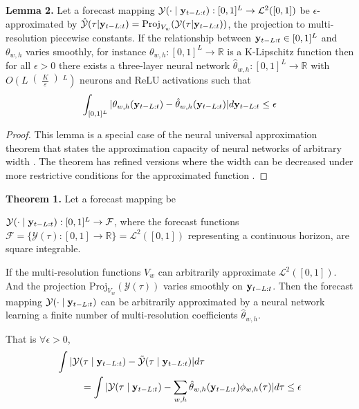 \textbf{Lemma 2.}
Let a forecast mapping $\mathcal{Y}(\cdot\;|\;\mathbf{y}_{t-L:t}): [0,1]^{L} \to \mathcal{L}^{2}([0,1])$ be $\epsilon$-approximated by $\hat{\mathcal{Y}}(\tau |\mathbf{y}_{t-L:t})=\mathrm{Proj}_{V_{w}}(\mathcal{Y}(\tau|\mathbf{y}_{t-L:t}))$, the projection to multi-resolution piecewise constants. If the relationship between $\mathbf{y}_{t-L:t} \in [0,1]^{L}$ and $\theta_{w,h}$ varies smoothly, for instance $\theta_{w,h}:[0,1]^{L}\to \mathbb{R}$ is a K-Lipschitz function then for all $\epsilon > 0$ there exists a three-layer neural network $\hat{\theta}_{w,h}: [0, 1]^L \rightarrow \mathbb{R}$ with $O\left(L\right(\frac{K}{\varepsilon}\left)^L\right)$ neurons and $\mathrm{ReLU}$ activations such that 
\begin{equation}
\int_{[0, 1]^L} |\theta_{w,h}(\mathbf{y}_{t-L:t}) - \hat{\theta}_{w,h}(\mathbf{y}_{t-L:t})| d\mathbf{y}_{t-L:t} \leq \epsilon
\end{equation}

\begin{proof}
This lemma is a special case of the neural universal approximation theorem that states the approximation capacity of neural networks of arbitrary width \citep{hornik1991approximation}. The theorem has refined versions where the width can be decreased under more restrictive conditions for the approximated function \citep{barron1993approximation, boris2017approximation}.
\end{proof}

\newpage
\textbf{Theorem 1.} Let a forecast mapping be

$\mathcal{Y}(\cdot \;|\; \mathbf{y}_{t-L:t}): [0, 1]^L \rightarrow \mathcal{F}$, where the forecast functions $\mathcal{F}=\{\mathcal{Y}(\tau): [0,1] \to \mathbb{R}\}=\mathcal{L}^{2}([0,1])$ representing a continuous horizon, are square integrable. 

If the multi-resolution functions $V_{w}$ can arbitrarily approximate $\mathcal{L}^{2}([0,1])$. And the projection $\mathrm{Proj}_{V_{w}}(\mathcal{Y}(\tau))$ varies smoothly on $\mathbf{y}_{t-L:t}$. Then the forecast mapping $\mathcal{Y}(\cdot \;|\; \mathbf{y}_{t-L:t})$ can be arbitrarily approximated by a neural network learning a finite number of  multi-resolution coefficients $\hat{\theta}_{w,h}$. %

That is $\forall \epsilon>0$, 
\begin{align}
\begin{split}
    \int |\mathcal{Y}(\tau \;|\; \mathbf{y}_{t-L:t}) -  \tilde{\mathcal{Y}}(\tau \;|\; \mathbf{y}_{t-L:t}) | d\tau \qquad\qquad\qquad\qquad\qquad \\
          = \int |\mathcal{Y}(\tau \;|\; \mathbf{y}_{t-L:t}) 
          -\sum_{w,h} \hat{\theta}_{w,h}(\mathbf{y}_{t-L:t}) \phi_{w,h}(\tau)| d\tau \leq \epsilon
\end{split}
\end{align}

